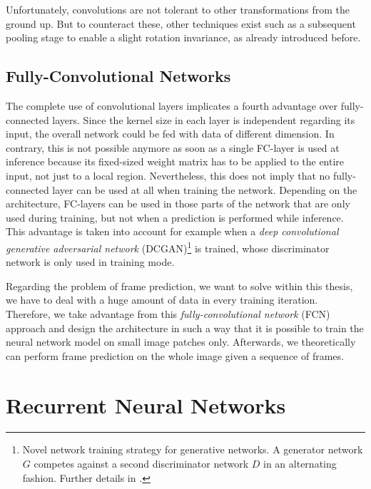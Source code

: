 Unfortunately, convolutions are not tolerant to other transformations from the ground up. But to counteract these, other techniques exist such as a subsequent pooling stage to enable a slight rotation invariance, as already introduced before.


\subsection{Fully-Convolutional Networks}

The complete use of convolutional layers implicates a fourth advantage over fully-connected layers. Since the kernel size in each layer is independent regarding its input, the overall network could be fed with data of different dimension. In contrary, this is not possible anymore as soon as a single FC-layer is used at inference because its fixed-sized weight matrix has to be applied to the entire input, not just to a local region. Nevertheless, this does not imply that no fully-connected layer can be used at all when training the network. Depending on the architecture, FC-layers can be used in those parts of the network that are only used during training, but not when a prediction is performed while inference. This advantage is taken into account for example when a \textit{deep convolutional generative adversarial network} (DCGAN)\footnote{Novel network training strategy for generative networks. A generator network $ G $ competes against a second discriminator network $ D $ in an alternating fashion. Further details in \parencite{gan}.} is trained, whose discriminator network is only used in training mode.

Regarding the problem of frame prediction, we want to solve within this thesis, we have to deal with a huge amount of data in every training iteration. Therefore, we take advantage from this \textit{fully-convolutional network} (FCN) approach and design the architecture in such a way that it is possible to train the neural network model on small image patches only. Afterwards, we theoretically can perform frame prediction on the whole image given a sequence of frames.


\section{Recurrent Neural Networks}

